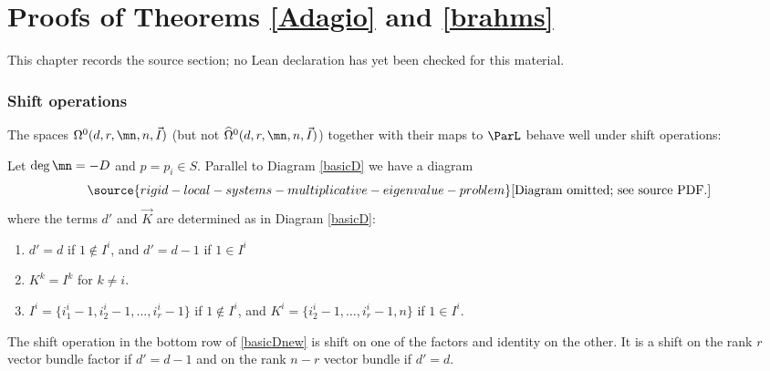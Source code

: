 \chapter{Proofs of Theorems \ref{Adagio} and \ref{brahms}}
\label{rigid-local-systems-multiplicative-eigenvalue-problem-chapter-09}

\begin{remark}
\label{rigid-local-systems-multiplicative-eigenvalue-problem-chapter-09-source}
This chapter records the source section; no Lean declaration has yet been checked for this material.
\notready
\end{remark}

\subsection{Shift operations}
The spaces ${\Omega}^0(d,r,\mn,n,\vec{I})$ (but not $\widehat{\Omega}^0(d,r,\mn,n,\vec{I})$) together with their maps to $\ParL$  behave well under shift operations:

Let $\deg\mn= -D$ and $p=p_i\in S$. Parallel to Diagram \eqref{basicD} we have a diagram
 \begin{equation}\label{basicDnew}
\source{rigid-local-systems-multiplicative-eigenvalue-problem}
\text{[Diagram omitted; see source PDF.]}
\end{equation}
where the terms $d'$ and $\vec{K}$ are determined as in Diagram \eqref{basicD}:
 \begin{enumerate}
 \item $d'=d$ if $1\notin I^i$, and $d'=d-1$ if $1\in I^i$
 \item $K^k=I^k$ for $k\neq i$.
 \item $I^i =\{i^i_1-1,i^i_2-1,\dots, i^i_r-1\}$ if $1\notin I^i$, and $K^i =\{i^i_2-1,\dots, i^i_r-1,n\}$ if $1\in I^i$.
 \end{enumerate}
 The shift operation in the bottom row of \eqref{basicDnew} is shift on one of the factors and identity on the other. It is a shift on the rank $r$ vector bundle factor if $d'=d-1$ and on the  rank $n-r$ vector bundle if $d'=d$.
